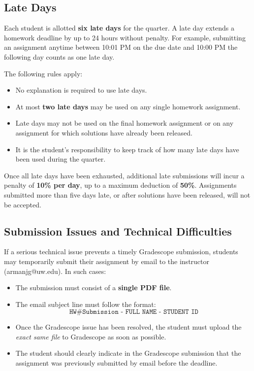 \documentclass[11pt]{article}
\begin{document}
\subsection{Late Days}

Each student is allotted \textbf{six late days} for the quarter. A late day extends a homework deadline by up to 24 hours without penalty. For example, submitting an assignment anytime between 10:01 PM on the due date and 10:00 PM the following day counts as one late day.

The following rules apply:

\begin{itemize}
   \item No explanation is required to use late days.
    \item At most \textbf{two late days} may be used on any single homework assignment.
    \item Late days may not be used on the final homework assignment or on any assignment for which solutions have already been released.
 
    \item It is the student's responsibility to keep track of how many late days have been used during the quarter.
\end{itemize}

Once all late days have been exhausted, additional late submissions will incur a penalty of \textbf{10\% per day}, up to a maximum deduction of \textbf{50\%}. Assignments submitted more than five days late, or after solutions have been released, will not be accepted.

\subsection{Submission Issues and Technical Difficulties}

If a serious technical issue prevents a timely Gradescope submission, students may temporarily submit their assignment by email to the instructor (armanjg@uw.edu). In such cases:

\begin{itemize}
    \item The submission must consist of a \textbf{single PDF file}.
    \item The email subject line must follow the format:
    \[
    \texttt{HW\# Submission - FULL NAME - STUDENT ID}
    \]
    \item Once the Gradescope issue has been resolved, the student must upload the \emph{exact same file} to Gradescope as soon as possible.
    \item The student should clearly indicate in the Gradescope submission that the assignment was previously submitted by email before the deadline.
\end{itemize}
\end{document}
